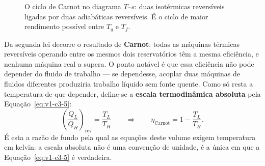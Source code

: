 \documentclass[12pt,a4paper]{article}
\numberwithin{equation}{section}
\numberwithin{table}{section}
\numberwithin{figure}{section}
\begin{document}
\begin{figure}[H]
\centering
{}
\caption[O ciclo de Carnot no diagrama $T$--$s$.]{O ciclo de Carnot no
diagrama $T$--$s$: duas isotérmicas reversíveis ligadas por duas adiabáticas
reversíveis. É o ciclo de maior rendimento possível entre $T_q$ e $T_f$.}
\label{fig:v1-c3-2}
\end{figure}


Da segunda lei decorre o resultado de \textbf{Carnot}: todas as máquinas
térmicas reversíveis operando entre os mesmos dois reservatórios têm a mesma
eficiência, e nenhuma máquina real a supera. O ponto notável é que essa
eficiência não pode depender do fluido de trabalho --- se dependesse, acoplar
duas máquinas de fluidos diferentes produziria trabalho líquido sem fonte
quente. Como só resta a temperatura de que depender, define-se a \textbf{escala
termodinâmica absoluta} pela Equação~\eqref{eq:v1-c3-5}:
\begin{equation}\label{eq:v1-c3-5}
\left(\frac{Q_L}{Q_H}\right)_{\text{rev}} = \frac{T_L}{T_H}
\qquad\Longrightarrow\qquad
\eta_{\text{Carnot}} = 1 - \frac{T_L}{T_H} .
\end{equation}
É esta a razão de fundo pela qual as equações deste volume exigem temperatura
em kelvin: a escala absoluta não é uma convenção de unidade, é a única em que a
Equação~\eqref{eq:v1-c3-5} é verdadeira.
\end{document}
